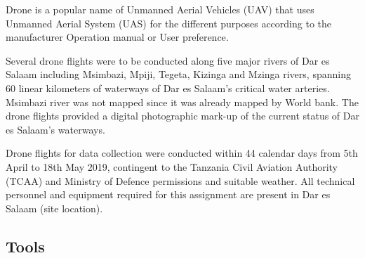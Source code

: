 \documentclass[a4paper,12pt,twoside]{article}
\begin{document}
    Drone is a popular name of Unmanned Aerial Vehicles (UAV) that uses Unmanned Aerial System (UAS) for the different purposes according to the manufacturer Operation manual or User preference. 

Several drone flights were to be  conducted along five major rivers of Dar es Salaam including  Msimbazi, Mpiji, Tegeta, Kizinga and Mzinga rivers, spanning 60 linear kilometers of waterways of Dar es Salaam’s critical water arteries. Msimbazi river was not mapped since it  was  already mapped by World bank. The drone flights provided a digital photographic mark-up of the current status of Dar es Salaam’s waterways. 

Drone flights for data collection were conducted within 44 calendar days from 5th April to 18th May 2019, contingent  to the Tanzania Civil Aviation Authority (TCAA) and Ministry of Defence permissions and suitable weather. All technical personnel and equipment required for this assignment are present in Dar es Salaam (site location). 

\subsection{Tools}
\end{document}
